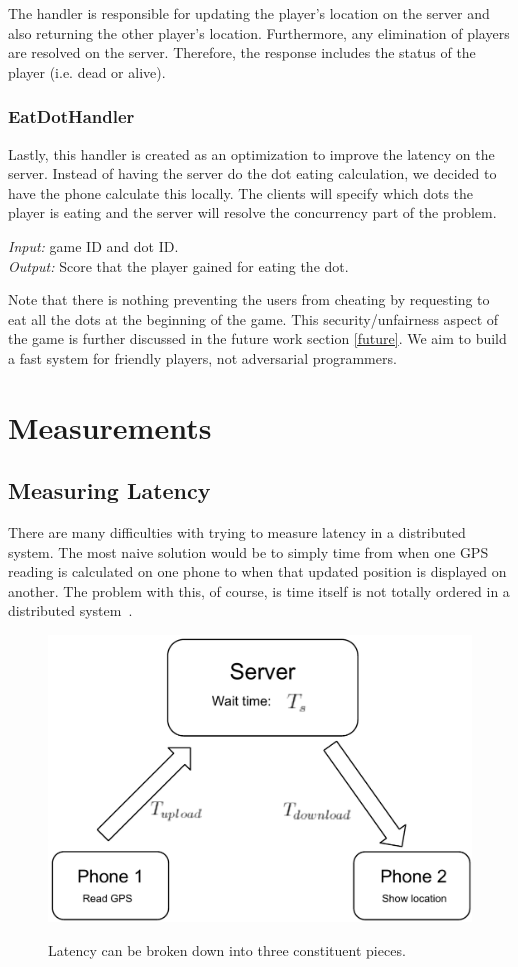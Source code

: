 \documentclass{acm_proc_article-sp}
\begin{document}
The handler is responsible for updating the player's location on the
server and also returning the other player's location. Furthermore,
any elimination of players are resolved on the server. Therefore, the
response includes the status of the player (i.e. dead or alive).

\subsubsection{EatDotHandler}
Lastly, this handler is created as an optimization to improve the
latency on the server. Instead of having the server do the dot eating
calculation, we decided to have the phone calculate this locally. The
clients will specify which dots the player is eating and the server
will resolve the concurrency part of the problem.

\emph{Input:} game ID and dot ID.\\
\emph{Output:} Score that the player gained for eating the dot.

Note that there is nothing preventing the users from cheating by
requesting to eat all the dots at the beginning of the game. This
security/unfairness aspect of the game is further discussed in the
future work section \ref{future}. We aim to build a fast system for
friendly players, not adversarial programmers.

\section{Measurements}
\subsection{Measuring Latency}\label{measuring}

There are many difficulties with trying to measure latency in a
distributed system.  The most naive solution would be to simply time
from when one GPS reading is calculated on one phone to when that
updated position is displayed on another. The problem with this, of
course, is time itself is not totally ordered in a distributed
system~\cite{Lamport:1978:TCO}.

\begin{figure}
\centering
\includegraphics[scale=0.4]{figs/LatencyExplanation}
\label{fig:LatencyExplanation}
\caption{Latency can be broken down into three constituent pieces.}
\end{figure}
\end{document}
